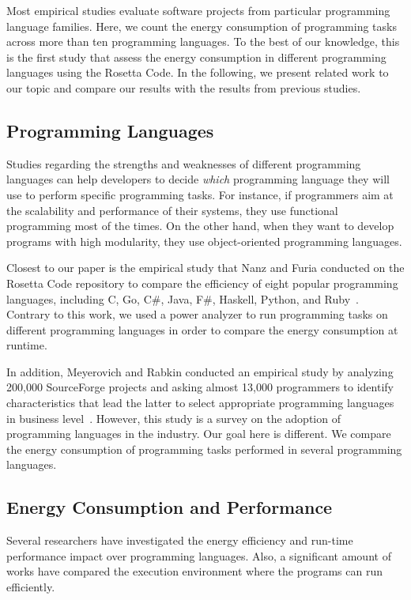 Most empirical studies evaluate software projects
from particular programming language families.
Here, we count the energy consumption of
programming tasks across more than ten programming languages.
To the best of our knowledge,
this is the first study that assess
the energy consumption in different programming languages
using the Rosetta Code.
In the following, we present related work to our topic
and compare our results with the results
from previous studies.

\subsection{Programming Languages}
Studies regarding the strengths and weaknesses of
different programming languages
can help developers to decide {\it which} programming language
they will use to perform specific programming tasks.
For instance, if programmers aim at the scalability
and performance of their systems,
they use functional programming most of the times.
On the other hand, when they want to develop
programs with high modularity,
they use object-oriented programming languages.

Closest to our paper is the empirical study that Nanz and Furia
conducted on the Rosetta Code repository
to compare the efficiency of eight popular programming languages,
including C, Go, C\#, Java, F\#, Haskell, Python, and  Ruby~\cite{NF15}.
Contrary to this work,
we used a power analyzer to run programming tasks
on different programming languages
in order to compare the energy consumption at runtime.

In addition, Meyerovich and Rabkin
conducted an empirical study by analyzing
200,000 SourceForge projects
and asking almost 13,000 programmers to
identify characteristics that lead the latter
to select appropriate programming languages in business level~\cite{MR13}.
However, this study is a survey on the adoption of programming languages in the industry.
Our goal here is different.
We compare the energy consumption of programming tasks
performed in several programming languages.

\subsection{Energy Consumption and Performance}
Several researchers have investigated the energy efficiency
and run-time performance impact over
programming languages.
Also, a significant amount of works have compared the execution
environment where the programs can run efficiently.

